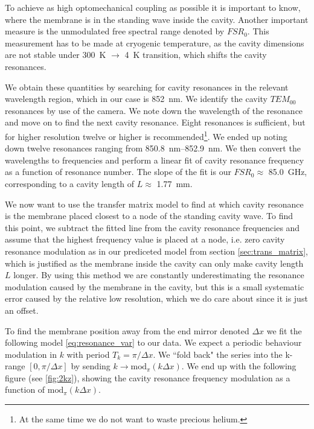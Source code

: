 To achieve as high optomechanical coupling as possible it is important to know, where the membrane is in the standing wave inside the cavity. Another important measure is the unmodulated free spectral range denoted by $FSR_0$. This measurement has to be made at cryogenic temperature, as the cavity dimensions are not stable under \SI{300}{\kelvin} $\rightarrow$ \SI{4}{\kelvin} transition, which shifts the cavity resonances.

We obtain these quantities by searching for cavity resonances in the relevant wavelength region, which in our case is \SI{852}{\nano\meter}. We identify the cavity $TEM_{00}$ resonances by use of the camera. We note down the wavelength of the resonance and move on to find the next cavity resonance. Eight resonances is sufficient, but for higher resolution twelve or higher is recommended\footnote{At the same time we do not want to waste precious helium.}. We ended up noting down twelve resonances ranging from \SIrange{850.8}{852.9}{\nano\meter}. We then convert the wavelengths to frequencies and perform a linear fit of cavity resonance frequency as a function of resonance number. The slope of the fit is our $FSR_0 \approx$ \SI{85.0}{\giga\hertz}, corresponding to a cavity length of $L \approx$ \SI{1.77}{\milli\meter}.

We now want to use the transfer matrix model to find at which cavity resonance is the membrane placed closest to a node of the standing cavity wave. To find this point, we subtract the fitted line from the cavity resonance frequencies and assume that the highest frequency value is placed at a node, i.e. zero cavity resonance modulation as in our prediceted model from section \ref{sec:trans_matrix}, which is justified as the membrane inside the cavity can only make cavity length $L$ longer. By using this method we are constantly underestimating the resonance modulation caused by the membrane in the cavity, but this is a small systematic error caused by the relative low resolution, which we do care about since it is just an offset.

To find the membrane position away from the end mirror denoted $\Delta x$ we fit the following model \eqref{eq:resonance_var} to our data. We expect a periodic behaviour modulation in $k$ with period $T_k = \pi/\Delta x$. We ``fold back" the series into the k-range $[0, \pi/\Delta x]$ by sending $k \rightarrow \mathrm{mod}_{\pi}(k\Delta x)$. We end up with the following figure (see \ref{fig:2kz}), showing the cavity resonance frequency modulation as a function of $\mathrm{mod}_{\pi}(k\Delta x)$.

